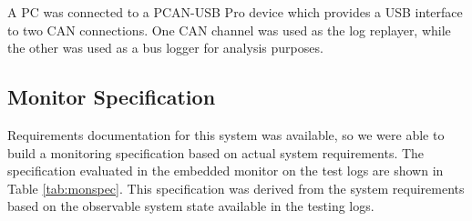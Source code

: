 A PC was connected to a PCAN-USB Pro \cite{PCAN-USBPro} device which provides a USB interface to two CAN connections. One CAN channel was used as the log replayer, while the other was used as a bus logger for analysis purposes.



\subsection{Monitor Specification}
\label{sec:monspec}
Requirements documentation for this system was available, so we were able to build a monitoring specification based on actual system requirements.
The specification evaluated in the embedded monitor on the test logs are shown in Table \ref{tab:monspec}. This specification was derived from the system requirements based on the observable system state available in the testing logs.

